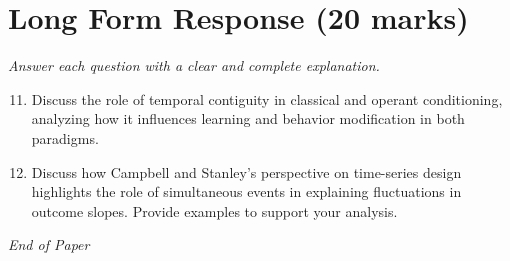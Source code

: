 \documentclass[12pt]{article}
\begin{document}
\section*{Long Form Response (20 marks)}
\textit{Answer each question with a clear and complete explanation.}
\begin{enumerate}[label=\arabic*.]
\setcounter{enumi}{10}
\item Discuss the role of temporal contiguity in classical and operant conditioning, analyzing
how it influences learning and behavior modification in both paradigms.
\item Discuss how Campbell and Stanley's perspective on time-series design highlights the role
of simultaneous events in explaining fluctuations in outcome slopes. Provide examples to
support your analysis.
\end{enumerate}

\vfill
\noindent\textit{End of Paper}
\end{document}
